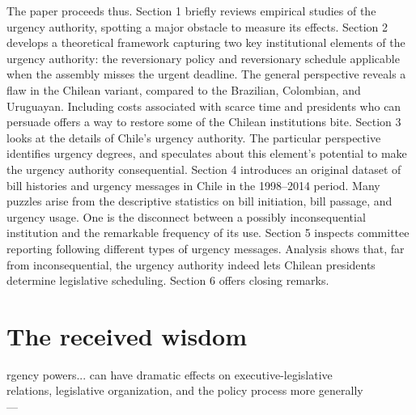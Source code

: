 \documentclass[letter,12pt]{article}
\begin{document}

The paper proceeds thus. Section 1 briefly reviews empirical studies of the urgency authority, spotting a major obstacle to measure its effects. Section 2 develops a theoretical framework capturing two key institutional elements of the urgency authority: the reversionary policy and reversionary schedule applicable when the assembly misses the urgent deadline. The general perspective reveals a flaw in the Chilean variant, compared to the Brazilian, Colombian, and Uruguayan. Including costs associated with scarce time and presidents who can persuade offers a way to restore some of the Chilean institutions bite. Section 3 looks at the details of Chile's urgency authority. The particular perspective identifies urgency degrees, and speculates about this element's potential to make the urgency authority consequential. Section 4 introduces an original dataset of bill histories and urgency messages in Chile in the 1998--2014 period. Many puzzles arise from the descriptive statistics on bill initiation, bill passage, and urgency usage. One is the disconnect between a possibly inconsequential institution and the remarkable frequency of its use. Section 5 inspects committee reporting following different types of urgency messages. Analysis shows that, far from inconsequential, the urgency authority indeed lets Chilean presidents determine legislative scheduling. Section 6 offers closing remarks. 


\section{The received wisdom}

\begin{center}
\singlespacing
[U]rgency powers... can have dramatic effects on executive-legislative \\ 
relations, legislative organization, and the policy process more generally\\ 
---\citet[][:438]{morgenstern.2002b}
\end{center}
\onehalfspacing
\end{document}
